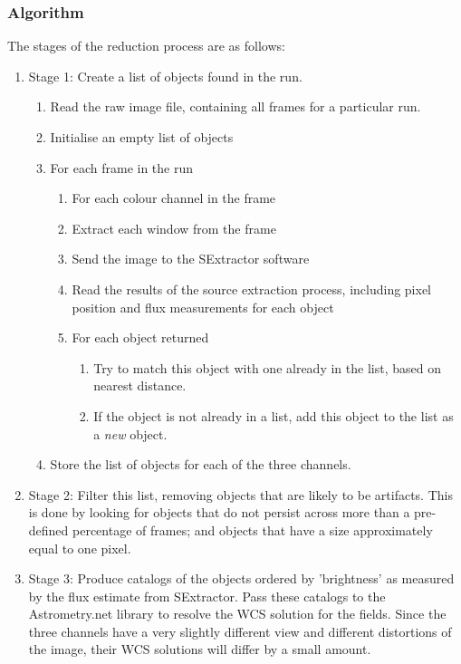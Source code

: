 \subsubsection{Algorithm}
The stages of the reduction process are as follows:
\begin{enumerate}
	\item Stage 1: Create a list of objects found in the run. 
	\begin{enumerate}
		\item Read the raw image file, containing all frames for a particular run.
		\item Initialise an empty list of objects
		\item For each frame in the run
		\begin{enumerate}
			\item For each colour channel in the frame
			\item Extract each window from the frame
			\item Send the image to the SExtractor software
			\item Read the results of the source extraction process, including pixel position and flux measurements for each object
			\item For each object returned
			\begin{enumerate} 
				\item Try to match this object with one already in the list, based on nearest distance.
				\item If the object is not already in a list, add this object to the list as a \emph{new} object.
			\end{enumerate}
		\end{enumerate}
		\item Store the list of objects for each of the three channels.
	\end{enumerate}
	\item Stage 2: Filter this list, removing objects that are likely to be artifacts. This is done by looking for objects that do not persist across more than a pre-defined percentage of frames; and objects that have a size approximately equal to one pixel. 
	\item Stage 3: Produce catalogs of the objects ordered by 'brightness' as measured by the flux estimate from SExtractor. Pass these catalogs to the Astrometry.net library to resolve the WCS solution for the fields. Since the three channels have a very slightly different view and different distortions of the image, their WCS solutions will differ by a small amount.

\end{enumerate}

